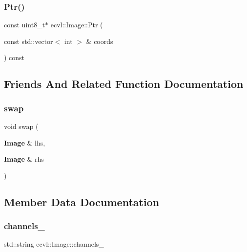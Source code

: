 \mbox{\label{classecvl_1_1_image_a8ea863e2e0573571b5cdf863061d1ec3}} 
\subsubsection{Ptr()\hspace{0.1cm}{\footnotesize\ttfamily [2/2]}}
{\footnotesize\ttfamily const uint8\+\_\+t$\ast$ ecvl\+::\+Image\+::\+Ptr (\begin{DoxyParamCaption}\item[{const std\+::vector$<$ int $>$ \&}]{coords }\end{DoxyParamCaption}) const\hspace{0.3cm}{\ttfamily [inline]}}



\subsection{Friends And Related Function Documentation}
\mbox{\label{classecvl_1_1_image_a46b938e56fb5d4f394d28839a6979c9e}} 
\subsubsection{swap}
{\footnotesize\ttfamily void swap (\begin{DoxyParamCaption}\item[{\textbf{ Image} \&}]{lhs,  }\item[{\textbf{ Image} \&}]{rhs }\end{DoxyParamCaption})\hspace{0.3cm}{\ttfamily [friend]}}



\subsection{Member Data Documentation}
\mbox{\label{classecvl_1_1_image_a3a8898ed7d960538843443c99e49ee34}} 
\subsubsection{channels\_}
{\footnotesize\ttfamily std\+::string ecvl\+::\+Image\+::channels\+\_\+}

\mbox{\label{classecvl_1_1_image_a48a690afebe942f779dd1520c61d4d9e}} 
